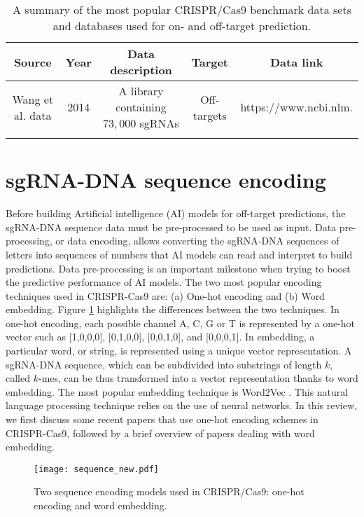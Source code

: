 \documentclass[unnumsec,webpdf,contemporary,large]{oup-authoring-template}
\theoremstyle{thmstyleone}%
\theoremstyle{thmstyletwo}%
\theoremstyle{thmstylethree}%
\begin{document}
% 

\begin{longtable}{ccccc}
\caption{A summary of the most popular CRISPR/Cas9 benchmark data sets and databases used for on- and off-target prediction. \label{tab1}} \\
\midrule
Source & Year & Data description & Target & Data link \\
\midrule
Wang et al. data \cite{wang2014genetic} & 2014 & A library containing $73,000$ sgRNAs & Off-targets & https://www.ncbi.nlm. \\
\botrule
\end{longtable}



\section{sgRNA-DNA sequence encoding}
Before building Artificial intelligence (AI) models for off-target predictions, the sgRNA-DNA sequence data must be pre-processed to be used as input. Data pre-processing, or data encoding, allows converting the sgRNA-DNA sequences of letters into sequences of numbers that AI models can read and interpret to build predictions. Data pre-processing is an important milestone when trying to boost the predictive performance of AI models. The two most popular encoding techniques used in CRISPR-Cas9 are: (a) One-hot encoding and (b) Word embedding. Figure \ref{fig:Encoding} highlights the differences between the two techniques. In one-hot encoding, each possible channel A, C, G or T is represented by a one-hot vector such as [1,0,0,0], [0,1,0,0], [0,0,1,0], and [0,0,0,1]. In embedding, a particular word, or string, is represented using a unique vector representation. A sgRNA-DNA sequence, which can be subdivided into substrings of length $k$, called $k$-mes, can be thus transformed into a vector representation thanks to word embedding. The most popular embedding technique is Word2Vec \cite{mikolov2013distributed}. This natural language processing technique relies on the use of neural networks. In this review, we first discuss some recent papers that use one-hot encoding schemes in CRISPR-Cas9, followed by a brief overview of papers dealing with word embedding.

\begin{figure}[b]
    \centering
    \vspace{-2.5em}
    \texttt{[image: sequence\_new.pdf]}
    \caption{Two sequence encoding models used in CRISPR/Cas9: one-hot encoding and word embedding.}
    \label{fig:Encoding}
\end{figure}
\end{document}
